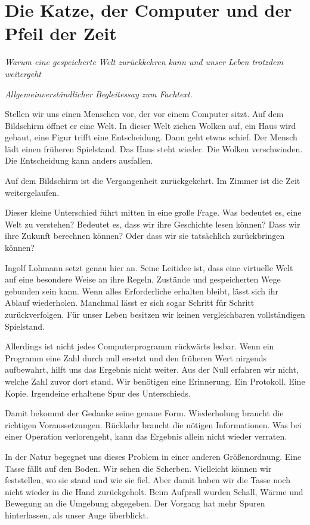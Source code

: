 \section{Die Katze, der Computer und der Pfeil der Zeit}
\label{de:essay}
\noindent\emph{Warum eine gespeicherte Welt zurückkehren kann und unser Leben trotzdem weitergeht}\par\smallskip
\noindent\textit{Allgemeinverständlicher Begleitessay zum Fachtext.}\par\medskip
Stellen wir uns einen Menschen vor, der vor einem Computer sitzt. Auf dem Bildschirm öffnet er eine Welt. In dieser Welt ziehen Wolken auf, ein Haus wird gebaut, eine Figur trifft eine Entscheidung. Dann geht etwas schief. Der Mensch lädt einen früheren Spielstand. Das Haus steht wieder. Die Wolken verschwinden. Die Entscheidung kann anders ausfallen.

Auf dem Bildschirm ist die Vergangenheit zurückgekehrt. Im Zimmer ist die Zeit weitergelaufen.

Dieser kleine Unterschied führt mitten in eine große Frage. Was bedeutet es, eine Welt zu verstehen? Bedeutet es, dass wir ihre Geschichte lesen können? Dass wir ihre Zukunft berechnen können? Oder dass wir sie tatsächlich zurückbringen können?

Ingolf Lohmann setzt genau hier an. Seine Leitidee ist, dass eine virtuelle Welt auf eine besondere Weise an ihre Regeln, Zustände und gespeicherten Wege gebunden sein kann. Wenn alles Erforderliche erhalten bleibt, lässt sich ihr Ablauf wiederholen. Manchmal lässt er sich sogar Schritt für Schritt zurückverfolgen. Für unser Leben besitzen wir keinen vergleichbaren vollständigen Spielstand.

Allerdings ist nicht jedes Computerprogramm rückwärts lesbar. Wenn ein Programm eine Zahl durch null ersetzt und den früheren Wert nirgends aufbewahrt, hilft uns das Ergebnis nicht weiter. Aus der Null erfahren wir nicht, welche Zahl zuvor dort stand. Wir benötigen eine Erinnerung. Ein Protokoll. Eine Kopie. Irgendeine erhaltene Spur des Unterschieds.

Damit bekommt der Gedanke seine genaue Form. Wiederholung braucht die richtigen Voraussetzungen. Rückkehr braucht die nötigen Informationen. Was bei einer Operation verlorengeht, kann das Ergebnis allein nicht wieder verraten.

In der Natur begegnet uns dieses Problem in einer anderen Größenordnung. Eine Tasse fällt auf den Boden. Wir sehen die Scherben. Vielleicht können wir feststellen, wo sie stand und wie sie fiel. Aber damit haben wir die Tasse noch nicht wieder in die Hand zurückgeholt. Beim Aufprall wurden Schall, Wärme und Bewegung an die Umgebung abgegeben. Der Vorgang hat mehr Spuren hinterlassen, als unser Auge überblickt.

